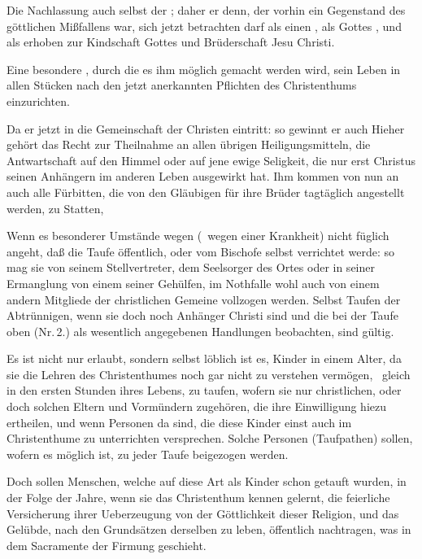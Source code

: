 \begin{aufza}
\begin{aufzb}
\item Die Nachlassung auch selbst der ; daher er denn, der vorhin ein Gegenstand des göttlichen Mißfallens war, sich jetzt betrachten darf als einen , als Gottes , und als erhoben zur Kindschaft Gottes und Brüderschaft Jesu Christi.
\item Eine besondere , durch die es ihm möglich gemacht werden wird, sein Leben in allen Stücken nach den jetzt anerkannten Pflichten des Christenthums einzurichten.~
\item Da er jetzt in die Gemeinschaft der Christen eintritt: so gewinnt er auch  Hieher gehört das Recht zur Theilnahme an allen übrigen Heiligungsmitteln, die Antwartschaft auf den Himmel oder auf jene ewige Seligkeit, die nur erst Christus seinen Anhängern im anderen Leben ausgewirkt hat. Ihm kommen von nun an auch alle Fürbitten, die von den Gläubigen für ihre Brüder tagtäglich angestellt werden, zu Statten, \usw\
\end{aufzb}
\item Wenn es besonderer Umstände wegen (\zB\  wegen einer Krankheit) nicht füglich angeht, daß die Taufe öffentlich, oder vom Bischofe selbst verrichtet werde: so mag sie von seinem Stellvertreter, dem Seelsorger des Ortes oder in seiner Ermanglung von einem seiner Gehülfen, im Nothfalle wohl auch von einem andern Mitgliede der christlichen Gemeine vollzogen werden. Selbst Taufen der Abtrünnigen, wenn sie doch noch Anhänger Christi sind und die bei der Taufe oben (Nr.\,2.) als wesentlich angegebenen Handlungen beobachten, sind gültig.
\item Es ist nicht nur erlaubt, sondern selbst löblich ist es, Kinder in einem Alter, da sie die Lehren des Christenthumes noch gar nicht zu verstehen vermögen, \zB\  gleich in den ersten Stunden ihres Lebens, zu taufen, wofern sie nur christlichen, oder doch solchen Eltern und Vormündern zugehören, die ihre Einwilligung hiezu ertheilen, und wenn Personen da sind, die diese Kinder einst auch im Christenthume zu unterrichten versprechen. Solche Personen (Taufpathen) sollen, wofern es möglich ist, zu jeder Taufe beigezogen werden.
\item Doch sollen Menschen, welche auf diese Art als Kinder schon getauft wurden, in der Folge der Jahre, wenn sie das Christenthum kennen gelernt, die feierliche Versicherung ihrer Ueberzeugung von der Göttlichkeit dieser Religion, und das Gelübde, nach den Grundsätzen derselben zu leben, öffentlich nachtragen, was in dem Sacramente der Firmung geschieht.

\end{aufza}
